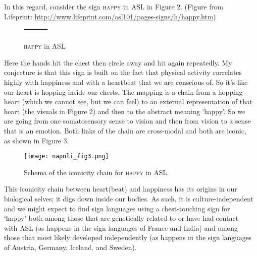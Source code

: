 \documentclass[output=paper,
modfonts
]{LSP/langsci}
\begin{document}
In this regard, consider the sign \textsc{happy} in ASL in Figure 2.
(Figure from Lifeprint:
\url{http://www.lifeprint.com/asl101/pages-signs/h/happy.htm})


\begin{figure}
	\begin{tabularx}{\linewidth}{CCC}
		  &  &  \\
	\end{tabularx}
	\caption{\textsc{happy} in ASL}
	\label{fig:2n}
\end{figure}

Here the hands hit the chest then circle away and hit again repeatedly.
My conjecture is that this sign is built on the fact that physical
activity correlates highly with happiness \citep{kahneman1999} and with a heartbeat that we are conscious of. So it's like our
heart is hopping inside our chests. The mapping is a chain from a
hopping heart (which we cannot see, but we can feel) to an external
representation of that heart (the visuals in Figure 2) and then to the
abstract meaning `happy'. So we are going from one somatosensory sense
to vision and then from vision to a sense that is an emotion. Both links
of the chain are cross-modal and both are iconic, as shown in Figure 3.

\begin{figure}
	\texttt{[image: napoli\_fig3.png]}
	\caption{Schema of the iconicity chain for \textsc{happy} in ASL}
	\label{fig:3n}
\end{figure}

This iconicity chain between heart(beat) and happiness has its origins
in our biological selves; it digs down inside our bodies. As such, it is
culture-independent and we might expect to find sign languages using a
chest-touching sign for `happy' both among those that are genetically
related to or have had contact with ASL (as happens in the sign
languages of France and India) and among those that most likely
developed independently (as happens in the sign languages of Austria,
Germany, Iceland, and Sweden).
\end{document}
